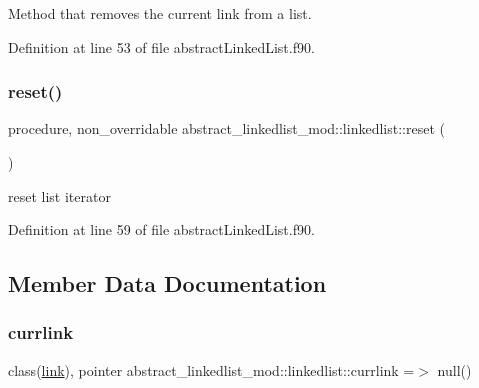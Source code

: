 Method that removes the current link from a list. 



Definition at line 53 of file abstract\+Linked\+List.\+f90.

\mbox{\label{structabstract__linkedlist__mod_1_1linkedlist_a3eb28d7a77ee8613ed566ec0148a1bd3}} 
\subsubsection{\texorpdfstring{reset()}{reset()}}
{\footnotesize\ttfamily procedure, non\+\_\+overridable abstract\+\_\+linkedlist\+\_\+mod\+::linkedlist\+::reset (\begin{DoxyParamCaption}{ }\end{DoxyParamCaption})\hspace{0.3cm}{\ttfamily [private]}}



reset list iterator 



Definition at line 59 of file abstract\+Linked\+List.\+f90.



\subsection{Member Data Documentation}
\mbox{\label{structabstract__linkedlist__mod_1_1linkedlist_a5039a762fe6e50feda0265f14386c478}} 
\subsubsection{\texorpdfstring{currlink}{currlink}}
{\footnotesize\ttfamily class(\mbox{\hyperlink{structlink__mod_1_1link}{link}}), pointer abstract\+\_\+linkedlist\+\_\+mod\+::linkedlist\+::currlink =$>$ null()\hspace{0.3cm}{\ttfamily [private]}}



